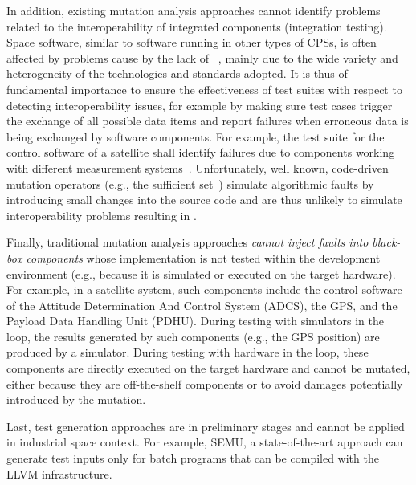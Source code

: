 In addition, existing mutation analysis approaches cannot identify problems related to the interoperability of integrated components (integration testing).
Space software, similar to software running in other types of CPSs, is often affected by problems cause by the lack of  ~\cite{Givehchi:2017,Jirkovsk:2017}, mainly due to the wide variety and heterogeneity of the technologies and standards adopted.
It is thus of fundamental importance to ensure the effectiveness of test suites with respect to detecting interoperability issues, for example by making sure test cases trigger the exchange of all possible data items and report failures when erroneous data is being exchanged by software components. For example, the test suite for the control software of a satellite shall identify failures due to components working with different measurement systems~\cite{MarsClimateOrbiter}.
Unfortunately, well known, code-driven mutation operators (e.g., the sufficient set~\cite{delamaro2014designing,delamaro2014experimental}) simulate algorithmic faults by introducing small changes into the source code and are thus unlikely to simulate interoperability problems resulting in .

Finally, traditional mutation analysis approaches  \emph{cannot inject faults into black-box components} whose implementation is not tested within the development environment (e.g., because it is simulated or executed on the target hardware).
For example, in a satellite system, such components include the control software of the Attitude Determination And Control System (ADCS), the GPS, and the Payload Data Handling Unit (PDHU). During testing with simulators in the loop, the results generated by such components (e.g., the GPS position) are produced by a simulator. During testing with hardware in the loop, these components are directly executed on the target hardware and cannot be mutated, either because they are off-the-shelf components
or to avoid damages potentially introduced by the mutation.

Last, test generation approaches are in preliminary stages and cannot be applied in industrial space context. For example, SEMU, a state-of-the-art approach can generate test inputs only for batch programs that can be compiled with the LLVM infrastructure.

